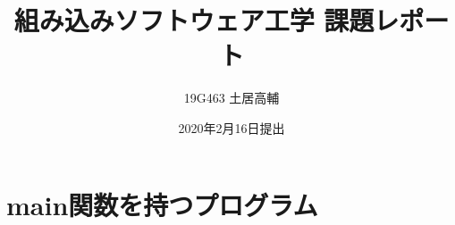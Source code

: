 \documentclass[titlepage]{ujarticle}
\title{組み込みソフトウェア工学 課題レポート}
\author{19G463 土居高輔}
\date{2020年2月16日提出}
\begin{document}
\maketitle

\section{main関数を持つプログラム}
\end{document}
